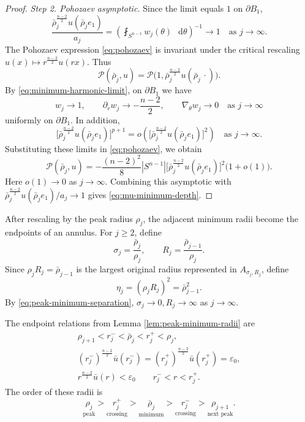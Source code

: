 \documentclass[11pt]{article}
\numberwithin{equation}{section}
\theoremstyle{remark}
\newcommand{\Sph}{S}
\newcommand{\cP}{\mathcal P}
\newcommand{\pa}{\partial}
\newcommand{\eps}{\varepsilon}
\newcommand{\dd}{\mathop{}\!\mathrm{d}}
\begin{document}
\begin{proof}
\emph{Step 2. Pohozaev asymptotic.}
Since the limit equals \(1\) on \(\pa B_1\),
\[
 \frac{\bar\rho_j^{\frac{n-2}{2}}u(\bar\rho_je_1)}{a_j}
 =
 \left(
 \fint_{\Sph^{n-1}}w_j(\theta)\,\dd\theta
 \right)^{-1}
 \to1
 \quad\text{as }j\to\infty.
\]
The Pohozaev expression \eqref{eq:pohozaev} is invariant under the critical
rescaling \(u(x)\mapsto r^{\frac{n-2}{2}}u(rx)\).  Thus
\[
 \cP(\bar\rho_j,u)
 =
 \cP\bigl(1,\bar\rho_j^{\frac{n-2}{2}}u(\bar\rho_j\,\cdot)\bigr).
\]
{By \eqref{eq:minimum-harmonic-limit}, on \(\pa B_1\) we have}
\[
 w_j\to1,
 \qquad
 \pa_rw_j\to-\frac{n-2}{2},
 \qquad
 \nabla_\theta w_j\to0
 \quad\text{as }j\to\infty
\]
uniformly on \(\partial B_1\). In addition,
\[
 \bigl[\bar\rho_j^{\frac{n-2}{2}}u(\bar\rho_je_1)\bigr]^{p+1}
 =
 o\left(
 \bigl[\bar\rho_j^{\frac{n-2}{2}}u(\bar\rho_je_1)\bigr]^2
 \right)
 \quad\text{as }j\to\infty.
\]
{Substituting these limits in \eqref{eq:pohozaev}, we obtain
\[
 \cP(\bar\rho_j,u)
 =
 -\frac{(n-2)^2}{8}|\Sph^{n-1}|
 \bigl[\bar\rho_j^{\frac{n-2}{2}}u(\bar\rho_je_1)\bigr]^2
 \bigl(1+o(1)\bigr).
\]
Here \(o(1)\to0\) as \(j\to\infty\). Combining this asymptotic with
\(\bar\rho_j^{\frac{n-2}{2}}u(\bar\rho_je_1)/a_j\to1\) gives
\eqref{eq:mu-minimum-depth}.}
\end{proof}

{
After rescaling by the peak radius \(\rho_j\), the adjacent minimum radii
become the endpoints of an annulus.  For \(j\ge2\), define
}
\begin{equation}\label{eq:annular-radii}
 \sigma_j=\frac{\bar\rho_j}{\rho_j},
 \qquad
 R_j=\frac{\bar\rho_{j-1}}{\rho_j}.
\end{equation}
Since \(\rho_jR_j=\bar\rho_{j-1}\) is the largest original radius
represented in \(A_{\sigma_j,R_j}\), define
\begin{equation}\label{eq:metric-perturbation-scale}
 \eta_j=(\rho_jR_j)^2=\bar\rho_{j-1}^2.
\end{equation}
By \eqref{eq:peak-minimum-separation}, \(\sigma_j\to0, R_j\to\infty\) as \(j\to\infty\).

{The endpoint relations from
Lemma  \ref{lem:peak-minimum-radii} are}
\begin{equation}\label{eq:level-crossing-radii}
 \begin{gathered}
 \rho_{j+1}<r_j^-<\bar\rho_j<r_j^+<\rho_j,\\
 (r_j^-)^{\frac{n-2}{2}}\bar u(r_j^-)
 =(r_j^+)^{\frac{n-2}{2}}\bar u(r_j^+)=\eps_0,\\
 r^{\frac{n-2}{2}}\bar u(r)<\eps_0
 \qquad r_j^-<r<r_j^+.
 \end{gathered}
\end{equation}
The order of these radii is
\[
 \underset{\text{peak}}{\rho_j}
 >\underset{\text{crossing}}{r_j^+}
 >\underset{\text{minimum}}{\bar\rho_j}
 >\underset{\text{crossing}}{r_j^-}
 >\underset{\text{next peak}}{\rho_{j+1}}.
\]
\end{document}
